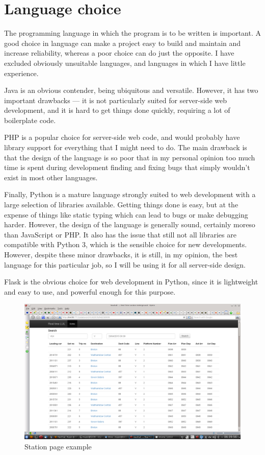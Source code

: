 \documentclass[a4paper,12pt,twoside]{report}
\begin{document}
\section{Language choice}

The programming language in which the program is to be written is important. A
good choice in language can make a project easy to build and maintain and
increase reliability, whereas a poor choice can do just the opposite. I have
excluded obviously unsuitable languages, and languages in which I have little
experience.

Java is an obvious contender, being ubiquitous and versatile. However, it has
two important drawbacks --- it is not particularly suited for server-side web
development, and it is hard to get things done quickly, requiring a lot of
boilerplate code.

PHP is a popular choice for server-side web code, and would probably have
library support for everything that I might need to do. The main drawback is
that the design of the language is so poor that in my personal opinion too much
time is spent during development finding and fixing bugs that simply wouldn't
exist in most other languages.

Finally, Python is a mature language strongly suited to web development with a
large selection of libraries available. Getting things done is easy, but at the
expense of things like static typing which can lead to bugs or make debugging
harder. However, the design of the language is generally sound, certainly
moreso than JavaScript or PHP. It also has the issue that still not all
libraries are compatible with Python 3, which is the sensible choice for new
developments. However, despite these minor drawbacks, it is still, in my
opinion, the best language for this particular job, so I will be using it for
all server-side design.

Flask is the obvious choice for web development in Python, since it is
lightweight and easy to use, and powerful enough for this purpose.

\begin{figure}[h]
  \centering
  \includegraphics[width=\linewidth]{sshot1}
  \caption{Station page example}
  \label{fig:sshot1}
\end{figure}
\end{document}
